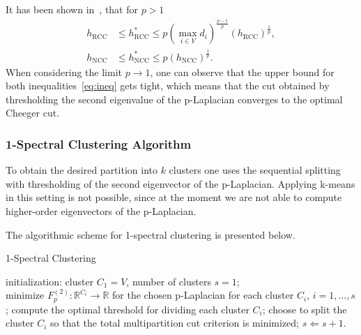 It has been shown in~\cite{Buhler09}, that for $p>1$ 
\begin{equation}
\label{eq:ineq}
 \begin{aligned}
  h_{\mathrm{RCC}} &\leq h_{\mathrm{RCC}}^* \leq p(\max_{i \in V} d_i)^{\frac{p-1}{p}} (h_{\mathrm{RCC}})^{\frac{1}{p}},\\
  h_{\mathrm{NCC}} &\leq h_{\mathrm{NCC}}^* \leq p( h_{\mathrm{NCC}})^{\frac{1}{p}}.
 \end{aligned}
\end{equation}
When considering the limit $p\rightarrow 1$, one can observe that the upper bound for both inequalities~\eqref{eq:ineq} gets tight, which means that the cut obtained by thresholding the second eigenvalue of the p-Laplacian converges to 
the optimal Cheeger cut. 
\subsubsection*{1-Spectral Clustering Algorithm}
To obtain the desired partition into $k$ clusters one uses the sequential splitting with thresholding of the second eigenvector of the p-Laplacian. Applying k-means in this setting is not possible, since at the moment 
we are not able to compute higher-order eigenvectors of the p-Laplacian. 

The algorithmic scheme for 1-spectral clustering is presented below.
\incmargin{1em}
\begin{algorithm}[hbtp]
\caption{1-Spectral Clustering}
\label{SCv1}
\dontprintsemicolon
\BlankLine
\Indm  
{}
\Indp
\BlankLine
initialization: cluster $C_1 = V$, number of clusters $s=1$;\\
{}
{
minimize $F_p^{(2)}: \mathbb{R}^{C_i}\longrightarrow \mathbb{R}$ for the chosen p-Laplacian for each cluster $C_i$, $i=1,\dots,s$;\;
compute the optimal threshold for dividing each cluster $C_i$;\;
choose to split the cluster $C_i$ so that the total multipartition cut criterion is minimized;\;
$s\Longleftarrow s+1$.
}
\BlankLine
\Indm  
{} 
\end{algorithm}
\decmargin{1em}
\newpage

